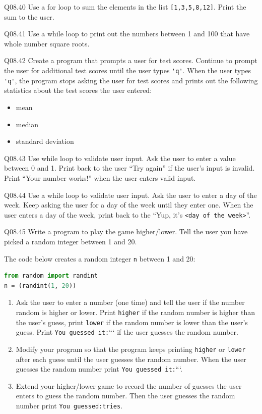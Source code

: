 \documentclass{book}
\providecommand{\tightlist}{%
      \setlength{\itemsep}{0pt}\setlength{\parskip}{0pt}}
\begin{document}
    
        Q08.40 Use a for loop to sum the elements in the list
\lstinline![1,3,5,8,12]!. Print the sum to the user.

Q08.41 Use a while loop to print out the numbers between 1 and 100 that
have whole number square roots.

Q08.42 Create a program that prompts a user for test scores. Continue to
prompt the user for additional test scores until the user types
\lstinline!'q'!. When the user types \lstinline!'q'!, the program stops
asking the user for test scores and prints out the following statistics
about the test scores the user entered:

\begin{itemize}
\tightlist
\item
  mean
\item
  median
\item
  standard deviation
\end{itemize}

Q08.43 Use while loop to validate user input. Ask the user to enter a
value between 0 and 1. Print back to the user ``Try again'' if the
user's input is invalid. Print ``Your number works!'' when the user
enters valid input.

Q08.44 Use a while loop to validate user input. Ask the user to enter a
day of the week. Keep asking the user for a day of the week until they
enter one. When the user enters a day of the week, print back to the
``Yup, it's \lstinline!<day of the week>!''.

Q08.45 Write a program to play the game higher/lower. Tell the user you
have picked a random integer between 1 and 20.

The code below creates a random integer \lstinline!n! between 1 and 20:

\begin{lstlisting}[language=Python]
from random import randint
n = (randint(1, 20))
\end{lstlisting}

\begin{enumerate}
\def\labelenumi{(\alph{enumi})}
\item
  Ask the user to enter a number (one time) and tell the user if the
  number random is higher or lower. Print \lstinline!higher! if the
  random number is higher than the user's guess, print \lstinline!lower!
  if the random number is lower than the user's guess. Print
  \lstinline!You guessed it:!``` if the user guesses the random number.
\item
  Modify your program so that the program keeps printing
  \lstinline!higher! or \lstinline!lower! after each guess until the
  user guesses the random number. When the user guesses the random
  number print \lstinline!You guessed it:!```.
\item
  Extend your higher/lower game to record the number of guesses the user
  enters to guess the random number. Then the user guesses the random
  number print \lstinline!You guessed:!\lstinline!tries!.
\end{enumerate}
\end{document}
